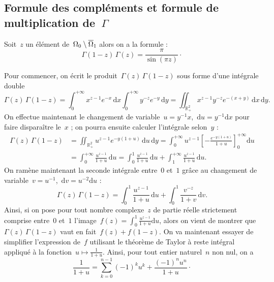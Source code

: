 	\subsection{Formule des compléments et formule de multiplication de~$\Gamma$}
	\unboldmath
		\begin{prop}\label{prop:formuleComplements}
			Soit~$z$ un élément de~$\Omega_0\setminus\overline{\Omega}_1$ alors on a la formule :
			\[
				\Gamma(1-z)\,\Gamma(z)=\frac{\pi}{\sin(\pi z)}\cdot
			\]
		\end{prop}
		\begin{dem}
			Pour commencer, on écrit le produit~$\Gamma(z)\,\Gamma(1-z)$ sous forme d'une intégrale double
			\[
				\Gamma(z)\,\Gamma(1-z)
						  =	\int_{0}^{+\infty} x^{z-1}e^{-x}\,\mathrm{d}x\int_{0}^{+\infty}y^{-z}e^{-y}
																					\,\mathrm{d}y
						  =	\iint_{\mathbb{R}_+^2} x^{z-1}y^{-z}e^{-(x+y)}\,\mathrm{d}x\,\mathrm{d}y.
			\]
			On effectue maintenant le changement de variable~$u = y^{-1}x$,~$\mathrm{d}u = y^{-1}\mathrm{d}x$ pour faire disparaître le~$x$ ; on pourra ensuite calculer l'intégrale selon~$y$ :
			\begin{align*}
				\Gamma(z)\,\Gamma(1-z) &	= 	\iint_{\mathbb{R}_+^2} u^{z-1}e^{-y(1+u)}
											\,\mathrm{d}u\,\mathrm{d}y
									 	=	\int_{0}^{+\infty} u^{z-1} 	\left[
									 		-\frac{e^{-y(1+u)}}{1+u} \right]_0^{+\infty}\!\!\mathrm{d}u\\
									 &  =	\int_{0}^{+\infty} \frac{u^{z-1}}{1+u}\,\mathrm{d}u
									 	=	\int_{0}^{1} \frac{u^{z-1}}{1+u}\,\mathrm{d}u +
									 		\int_{1}^{+\infty} \frac{u^{z-1}}{1+u}\,\mathrm{d}u.
			\end{align*}
			On ramène maintenant la seconde intégrale entre~$0$ et~$1$ grâce au changement de variable~$v=u^{-1}$,~$\mathrm{d}v=u^{-2}\mathrm{d}u$ :
			\[
				\Gamma(z)\,\Gamma(1-z) = \int_{0}^{1} \frac{u^{z-1}}{1+u}\,\mathrm{d}u + \int_{0}^{1} \frac{v^{-z}}{1+v}\,\mathrm{d}v.
			\]
			Ainsi, si on pose pour tout nombre complexe~$z$ de partie réelle strictement comprise entre~$0$ et~$1$ l'image~$f(z)=\int_{0}^{1}\frac{u^{z-1}}{1+u}\mathrm{d}u$, alors on vient de montrer que~$\Gamma(z)\,\Gamma(1-z)$ vaut en fait~$f(z) + f(1-z)$. On va maintenant essayer de simplifier l'expression de~$f$ utilisant le théorème de Taylor à reste intégral appliqué à la fonction~$u\mapsto\frac{1}{1+u}$. Ainsi, pour tout entier naturel~$n$ non nul, on a
			\[
				\frac{1}{1+u} = \sum_{k=0}^{n-1} (-1)^k u^k + \frac{(-1)^n u^n}{1+u}\cdot
			\]

\end{dem}
